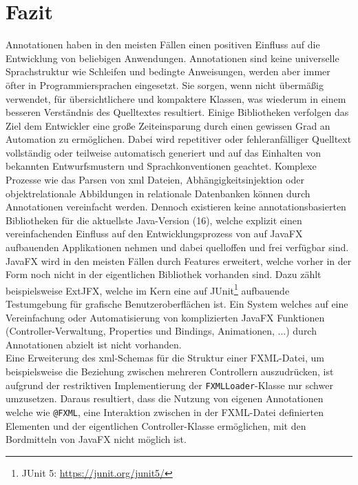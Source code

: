 \section{Fazit}
\label{ms_fazit}
Annotationen haben in den meisten Fällen einen positiven Einfluss auf die Entwicklung von beliebigen Anwendungen. Annotationen sind keine universelle Sprachstruktur wie Schleifen und bedingte Anweisungen, werden aber immer öfter in Programmiersprachen eingesetzt. Sie sorgen, wenn nicht übermäßig verwendet, für übersichtlichere und kompaktere Klassen, was wiederum in einem besseren Verständnis des Quelltextes resultiert. Einige Bibliotheken verfolgen das Ziel dem Entwickler eine große  Zeiteinsparung durch einen gewissen Grad an Automation zu ermöglichen. Dabei wird repetitiver oder fehleranfälliger Quelltext vollständig oder teilweise automatisch generiert und auf das Einhalten von bekannten Entwurfsmustern und Sprachkonventionen geachtet. Komplexe Prozesse wie das Parsen von \ac{xml} Dateien, Abhängigkeitsinjektion oder objektrelationale Abbildungen in relationale Datenbanken können durch Annotationen vereinfacht werden. Dennoch existieren keine annotationsbasierten Bibliotheken für die aktuellste Java-Version (16), welche explizit einen vereinfachenden Einfluss auf den Entwicklungsprozess von auf JavaFX aufbauenden Applikationen nehmen und dabei quelloffen und frei verfügbar sind. JavaFX wird in den meisten Fällen durch Features erweitert, welche vorher in der Form noch nicht in der eigentlichen Bibliothek vorhanden sind. Dazu zählt beispielsweise ExtJFX, welche im Kern eine auf JUnit\footnote{JUnit 5: \url{https://junit.org/junit5/}} aufbauende Testumgebung für grafische Benutzeroberflächen ist. Ein System welches auf eine Vereinfachung oder Automatisierung von komplizierten JavaFX Funktionen (Controller-Verwaltung, Properties und Bindings, Animationen, ...) durch Annotationen abzielt ist nicht vorhanden.\\
Eine Erweiterung des \ac{xml}-Schemas für die Struktur einer FXML-Datei, um beispielsweise die Beziehung zwischen mehreren Controllern auszudrücken, ist aufgrund der restriktiven Implementierung der \texttt{FXMLLoader}-Klasse nur schwer umzusetzen. Daraus resultiert, dass die Nutzung von eigenen Annotationen welche wie \texttt{@FXML}, eine Interaktion zwischen in der FXML-Datei definierten Elementen und der eigentlichen Controller-Klasse ermöglichen, mit den Bordmitteln von JavaFX nicht möglich ist.

